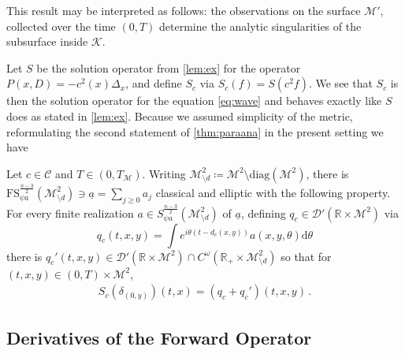\documentclass[
	fontsize=11pt, 
	twoside=false, 
	abstract=true, 
	a4paper,
]{scrartcl}
\newcommand{\RR}{\mathbb{R}}
\newcommand{\DD}{\mathscr{D}}
\newcommand{\dd}{\mathrm{d}}
\newcommand{\del}{\partial}
\newcommand{\supp}{\mathrm{supp}}
\newcommand{\ud}[1]{\underline{#1}}
\begin{document}
This result may be interpreted as follows: the observations on the surface $\mathcal{M}'$, collected over the time $(0,T)$ determine the analytic singularities of the subsurface inside $\mathcal{K}$. 

Let $S$ be the solution operator from \cref{lem:ex} for the operator $P(x,D)=-c^2(x)\Delta_x$, and define $S_c$ via $S_c(f) = S(c^2f)$. We see that $S_c$ is then the solution operator for the equation \cref{eq:wave} and behaves exactly like $S$ does as stated in \cref{lem:ex}. Because we assumed simplicity of the metric, reformulating the second statement of \cref{thm:paraana} in the present setting we have
\begin{proposition}\label{thm:paraseis} 
	Let $c\in\mathcal{C}$ and $T \in (0,T_{\mathcal{M}})$. Writing $\mathcal{M}^2_{\setminus d} \coloneqq \mathcal{M}^2\setminus \mathrm{diag}(\mathcal{M}^2)$, there is $\mathrm{FS}_{\psi a}^{\frac{n-3}{2}}(\mathcal{M}^2_{\setminus d}) \ni \ud{a} = \sum_{j\geq 0} a_j$ classical and elliptic with the following property. For every finite realization $a \in S_{\psi a}^{\frac{n-3}{2}}(\mathcal{M}^2_{\setminus d})$ of $\ud{a}$, defining $q_c \in \DD'(\RR\times \mathcal{M}^2)$ via
	\begin{equation}\label{eq:giveqseis}
		q_c(t,x,y) = \int e^{i\theta(t-d_c(x,y))}a(x,y,\theta)\dd\theta
	\end{equation}
	there is $q_c'(t,x,y) \in \DD'(\RR\times \mathcal{M}^2) \cap C^\omega(\RR_+\times\mathcal{M}^2_{\setminus d})$ so that for $(t,x,y)\in (0,T)\times \mathcal{M}^2$,
	 \begin{equation}\label{eq:hypsolveseis}
		\begin{alignedat}{2}
			S_c(\delta_{(0,y)})(t,x) = (q_c+q_c')(t,x,y)\,.
	\end{alignedat}
	\end{equation}
%
%
\end{proposition}

\subsection{Derivatives of the Forward Operator}%
\end{document}
